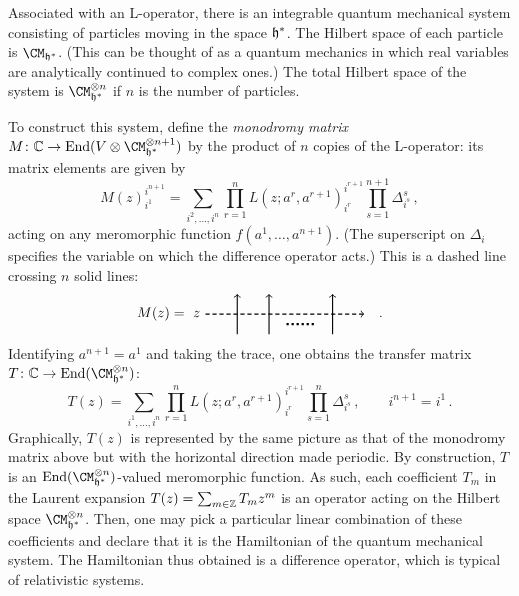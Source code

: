 Associated with an L-operator, there is an integrable quantum
mechanical system consisting of particles moving in the space $\mathfrak{h}^*$.
The Hilbert space of each particle is $\CM_{\hf^*}$.  (This
can be thought of as a quantum
mechanics in which real variables are analytically continued to
complex ones.) The total Hilbert space of the system is
$\CM_{\hf^*}^{\otimes n}$ if $n$ is the number of particles.

To construct this system, define the \emph{monodromy matrix}
$M\colon \C \to \End(V \otimes \CM_{\hf^*}^{\otimes n + 1})$ by the
product of $n$ copies of the L-operator: its matrix elements are given
by
\begin{equation}
  M(z)^{i^{n+1}}_{i^1}
  =
  \sum_{i^2, \dotsc, i^n}
  \prod_{r=1}^n
  L(z; a^r,a^{r+1})^{i^{r+1}}_{i^r}
  \prod_{s=1}^{n+1} \Delta_{i^s}^s \,,
\end{equation}
acting on any meromorphic function $f(a^1, \dotsc, a^{n+1})$.  (The
superscript on $\Delta_i$ specifies the variable on which the
difference operator acts.)  This is a dashed line crossing $n$ solid
lines:
\begin{equation}
  M(z)
  =
  \begin{tikzpicture}[xscale=0.8, yscale=0.5, baseline=(x.base)]
    \node (x) at (0,0) {\vphantom{x}};

    \draw[thick, densely dashed, ->] (0,0) node[left] {$z$} -- (5,0);
    \draw[thick, ->] (1,-1) -- +(90:2);
    \draw[thick, ->] (2,-1) -- +(90:2);

    \draw[ultra thick, dotted, -] (2.55,-0.5) -- (3.45,-0.5);

    \draw[thick, ->] (4,-1) -- +(90:2);
  \end{tikzpicture}
  \quad .
\end{equation}
Identifying $a^{n+1} = a^1$ and taking the trace, one
obtains the transfer matrix
$T\colon \C \to \End(\CM_{\hf^*}^{\otimes n})$:
\begin{equation}
  T(z)
  =
  \sum_{i^1, \dotsc, i^n}
  \prod_{r=1}^n
  L(z; a^r,a^{r+1})^{i^{r+1}}_{i^r}
  \prod_{s=1}^n \Delta_{i^s}^s
  \,,
  \qquad
  i^{n+1} = i^1 \,.
\end{equation}
Graphically, $T(z)$ is represented by the same picture as
that of the monodromy matrix above but
with the horizontal direction made periodic.
By construction, $T$ is an $\End(\CM_{\hf^*}^{\otimes n})$-valued
meromorphic function.  As such, each coefficient $T_m$ in the Laurent
expansion $T(z) = \sum_{m \in \mathbb{Z}} T_m z^m$ is an operator acting on
the Hilbert space $\CM_{\hf^*}^{\otimes n}$.  Then, one may pick a
particular linear combination of these coefficients and declare that
it is the Hamiltonian of the quantum mechanical system.  The
Hamiltonian thus obtained is a difference operator, which is typical
of relativistic systems.

